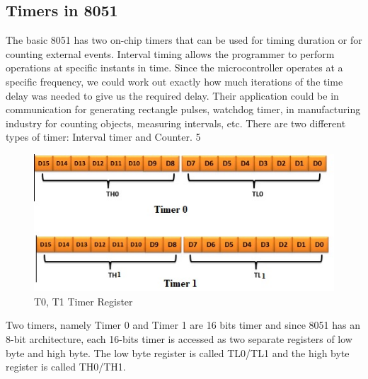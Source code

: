 \documentclass{article}
\begin{document}
\subsection{Timers in 8051}
The basic 8051 has two on-chip timers that can be used for
timing duration or for counting external events. Interval timing
allows the programmer to perform operations at specific
instants in time. Since the microcontroller operates at a specific
frequency, we could work out exactly how much iterations of
the time delay was needed to give us the required delay. Their application could be in communication for  generating  rectangle  pulses,  watchdog  timer,  in  manufacturing industry  for  counting objects,  measuring  intervals,  etc.  There  are  two  different  types  of timer:  Interval  timer  and Counter.
5
\begin{figure}[H]
    \centering
    \includegraphics[scale=0.79,cframe=blue 0.5pt 3pt]{./t0t1.jpg}
    \caption{T0, T1 Timer Register}
\end{figure}

Two timers, namely Timer 0 and Timer 1 are 16 bits timer
and since 8051 has an 8-bit architecture, each 16-bits timer is
accessed as two separate registers of low byte and high byte.
The low byte register is called TL0/TL1 and the high byte
register is called TH0/TH1.
\end{document}
